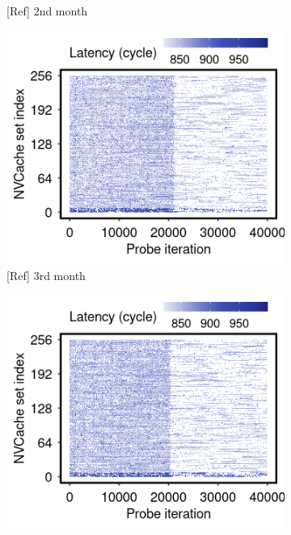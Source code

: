 \begin{figure}[t]
\begin{subfigure}[b]{.24\linewidth}
        \caption{[Ref] 2nd month}
        \label{fig:13:ref:side-channel-sqlite-month2}
    \end{subfigure}
    \hfill
    \begin{subfigure}[b]{.24\linewidth}
        \centering
        \includegraphics[width=\linewidth]{figure/plot/reference/fig13-side-sql-range-month3.png}
        \caption{[Ref] 3rd month}
        \label{fig:13:ref:side-channel-sqlite-month3}
    \end{subfigure}
    \hfill
    \begin{subfigure}[b]{.24\linewidth}
        \centering
        \includegraphics[width=\linewidth]{figure/plot/reference/fig13-side-sql-range-month4.png}

\end{subfigure}
\end{figure}
